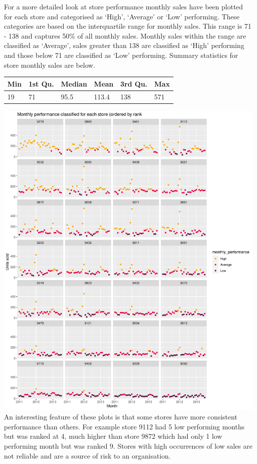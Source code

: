 \documentclass[
  11pt,
]{article}
\begin{document}
For a more detailed look at store performance monthly sales have been
plotted for each store and categorised as `High', `Average' or `Low'
performing. These categories are based on the interquartile range for
monthly sales. This range is 71 - 138 and captures 50\% of all monthly
sales. Monthly sales within the range are classified as `Average', sales
greater than 138 are classified as `High' performing and those below 71
are classified as `Low' performing. Summary statistics for store monthly
sales are below.

\begin{longtable}[]{@{}llllll@{}}
\toprule
Min & 1st Qu. & Median & Mean & 3rd Qu. & Max \\
\midrule
\endhead
19 & 71 & 95.5 & 113.4 & 138 & 571 \\
\bottomrule
\end{longtable}

\includegraphics{Assignment-STAT702---final_files/figure-latex/store plots-1.pdf}
An interesting feature of these plots is that some stores have more
consistent performance than others. For example store 9112 had 5 low
performing months but was ranked at 4, much higher than store 9872 which
had only 1 low performing month but was ranked 9. Stores with high
occurrences of low sales are not reliable and are a source of risk to an
organisation.
\end{document}
